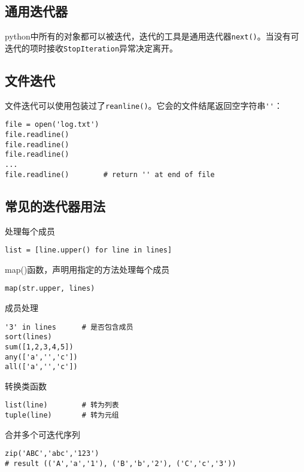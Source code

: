 		\subsection{通用迭代器}

			python中所有的对象都可以被迭代，迭代的工具是通用迭代器\verb|next()|。当没有可迭代的项时接收\verb|StopIteration|异常决定离开。

		\subsection{文件迭代}

			文件迭代可以使用包装过了\verb|reanline()|。它会的文件结尾返回空字符串\verb|''|：

\begin{lstlisting}
file = open('log.txt')
file.readline()
file.readline()
file.readline()
...
file.readline()        # return '' at end of file
\end{lstlisting}

		\subsection{常见的迭代器用法}

			处理每个成员
\begin{lstlisting}
list = [line.upper() for line in lines]
\end{lstlisting}

			map()函数，声明用指定的方法处理每个成员

\begin{lstlisting}
map(str.upper, lines)         
\end{lstlisting}

			成员处理

\begin{lstlisting}
'3' in lines      # 是否包含成员
sort(lines)
sum([1,2,3,4,5])
any(['a','','c'])
all(['a','','c'])
\end{lstlisting}

			转换类函数

\begin{lstlisting}
list(line)        # 转为列表
tuple(line)       # 转为元组
\end{lstlisting}

			合并多个可迭代序列

\begin{lstlisting}
zip('ABC','abc','123') 
# result (('A','a','1'), ('B','b','2'), ('C','c','3'))
\end{lstlisting}

